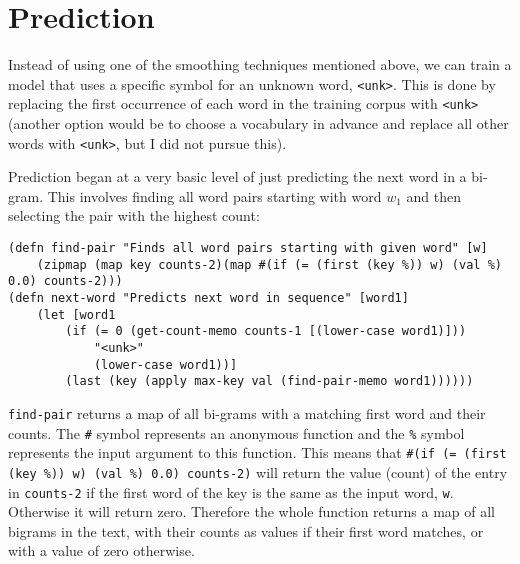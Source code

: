 



\section{Prediction}

Instead of using one of the smoothing techniques mentioned above, we can train a model that uses a specific symbol for an unknown word, \lstinline!<unk>!. This is done by replacing the first occurrence of each word in the training corpus with \lstinline!<unk>! (another option would be to choose a vocabulary in advance and replace all other words with \lstinline!<unk>!, but I did not pursue this).

Prediction began at a very basic level of just predicting the next word in a bi-gram. This involves finding all word pairs starting with word $w_{1}$ and then selecting the pair with the highest count:

\begin{lstlisting}
(defn find-pair "Finds all word pairs starting with given word" [w] 
	(zipmap (map key counts-2)(map #(if (= (first (key %)) w) (val %) 0.0) counts-2)))
(defn next-word "Predicts next word in sequence" [word1] 
	(let [word1 
		(if (= 0 (get-count-memo counts-1 [(lower-case word1)]))
			"<unk>" 
			(lower-case word1))] 
		(last (key (apply max-key val (find-pair-memo word1))))))
\end{lstlisting}

\lstinline!find-pair! returns a map of all bi-grams with a matching first word and their counts. The \lstinline!#! symbol represents an anonymous function and the \lstinline!%! symbol represents the input argument to this function. This means that \lstinline!#(if (= (first (key %)) w) (val %) 0.0) counts-2)! will return the value (count) of the entry in \lstinline!counts-2! if the first word of the key is the same as the input word, \lstinline!w!. Otherwise it will return zero. Therefore the whole function returns a map of all bigrams in the text, with their counts as values if their first word matches, or with a value of zero otherwise.


